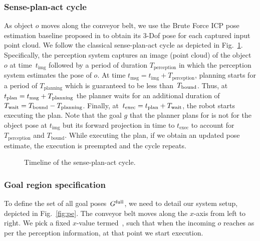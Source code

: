 \documentclass[a4paper]{report}
\begin{document}
\subsubsection{Sense-plan-act cycle}
As object $o$ moves along the conveyor belt, we use the Brute Force ICP pose estimation baseline proposed in \cite{narayanan2016perch} to obtain its 3-Dof pose for each captured input point cloud.
We follow the classical sense-plan-act cycle as depicted in Fig.~\ref{fig:tl}.
Specifically, 
the perception system captures an image (point cloud) of the object~$o$ at time~$t_{\textrm{img}}$
followed by a period of duration $T_{\textrm{perception}}$ in which the perception system estimates the pose of $o$.
At time $t_{\textrm{msg}} = t_{\textrm{img}} + T_{\textrm{perception}}$, planning starts for a period of $T_{\textrm{planning}}$ which is guaranteed to be less than~$T_{\textrm{bound}}$.
Thus, at $t_{\textrm{plan}} = t_{\textrm{msg}} + T_{\rm planning}$ the planner waits for an additional duration of $T_{\rm wait} = T_{\textrm{bound}} - T_{\rm planning}$.
Finally, at~$t_{\textrm{exec}} = t_{\textrm{plan}} + T_{\rm wait}$, the robot starts executing the plan. Note that the goal $g$ that the planner plans for is not for the object pose at $t_{\textrm{img}}$ but its forward projection in time to $t_{\textrm{exec}}$ to account for $T_{\textrm{perception}}$ and $T_{\textrm{bound}}$.
While executing the plan, if we obtain an updated pose estimate, the execution is preempted and the cycle repeats.

\begin{figure}[t]
    \centering
    \caption{\CaptionTextSize Timeline of the sense-plan-act cycle.}
    \label{fig:tl}
\end{figure}

\subsubsection{Goal region specification}
\label{sec:goal_region}
To define the set of all goal poses~$G^{\textrm{full}}$, we need to detail our system setup, depicted in Fig.~\ref{fig:pe}.
The conveyor belt moves along the $x$-axis from left to right.
We pick a fixed $x$-value termed~\Xexec, such that when the incoming $o$ reaches \Xexec as per the perception information, at that point we start execution.
\end{document}
